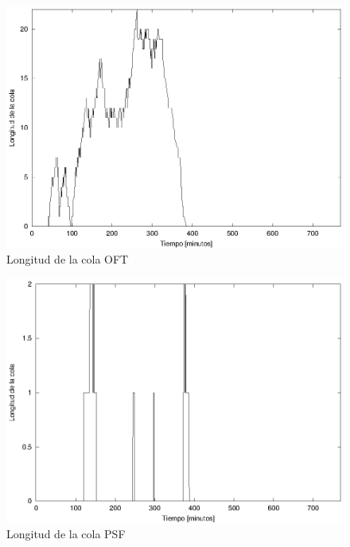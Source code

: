 \documentclass[a4paper,10pt]{article}
\begin{document}
\begin{figure}[hp]
\centering
\includegraphics{graficos/plot_longitud_OFT.eps}
\caption{Longitud de la cola OFT}
\label{fig:colaOFT}
\end{figure}


\begin{figure}[hp]
\centering
\includegraphics{graficos/plot_longitud_PSF.eps}
\caption{Longitud de la cola PSF}
\label{fig:colaPSF}
\end{figure}
\end{document}
